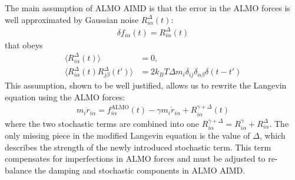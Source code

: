 \documentclass[aps,prl,reprint,amsmath,amssymb]{revtex4-1}
\begin{document}
The main assumption of ALMO AIMD is that the error in the ALMO forces is well approximated by Gaussian noise $R^{\Delta}_{i\alpha} (t)$:
%
\begin{align}
\label{eq:assumption}
\delta f_{i\alpha}(t) = R^{\Delta}_{i\alpha} (t)
\end{align}
%
that obeys
%
\begin{align}
\label{eq:stochastic2}
\langle R^{\Delta}_{i\alpha} (t) \rangle &= 0, \\
\label{eq:stochastic3}
\langle R^{\Delta}_{i\alpha} (t)  R^{\Delta}_{j\beta} (t') \rangle &= 2 k_B T \Delta m_i \delta_{ij} \delta_{\alpha\beta} \delta(t-t')
\end{align}
%
This assumption, shown to be well justified, allows us to rewrite the Langevin equation using the ALMO forces:
%
\begin{align}
\label{eq:langevin2}
m_i \ddot{r}_{i\alpha} = f^{\text{ALMO}}_{i\alpha}(t) - \gamma m_i \dot{r}_{i\alpha} + R^{\gamma + \Delta}_{i\alpha} (t)
\end{align}
%
where the two stochastic terms are combined into one $R^{\gamma + \Delta}_{i\alpha} = R^{\gamma}_{i\alpha} + R^{\Delta}_{i\alpha}$. 
The only missing piece in the modified Langevin equation is the value of $\Delta$, which describes the strength of the newly introduced stochastic term. 
This term compensates for imperfections in ALMO forces and must be adjusted to re-balance the damping and stochastic components in ALMO AIMD.


\end{document}
